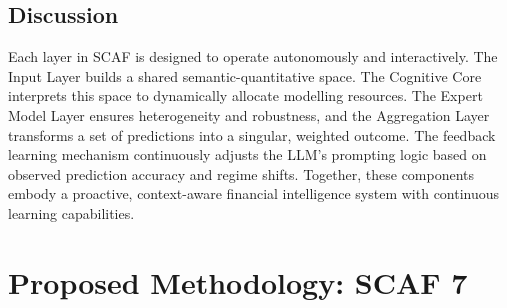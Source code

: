 \documentclass[conference]{IEEEtran}
\begin{document}
\subsection{Discussion}
Each layer in SCAF is designed to operate autonomously and interactively. The Input Layer builds a shared semantic-quantitative space. The Cognitive Core interprets this space to dynamically allocate modelling resources. The Expert Model Layer ensures heterogeneity and robustness, and the Aggregation Layer transforms a set of predictions into a singular, weighted outcome. The feedback learning mechanism continuously adjusts the LLM's prompting logic based on observed prediction accuracy and regime shifts. Together, these components embody a proactive, context-aware financial intelligence system with continuous learning capabilities.
\section{Proposed Methodology: SCAF 7}
\end{document}
